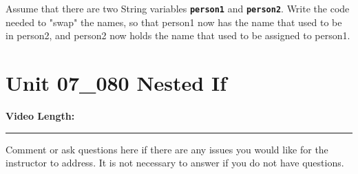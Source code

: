 \documentclass[letterpaper,12pt]{exam}
\newcommand{\unit}{Unit 07}
\begin{document}
\begin{questions}
\begin{samepage}
    \question Assume that there are two String variables \texttt{\textbf{person1}} and \texttt{\textbf{person2}}. Write the code needed to "swap" the names, so that person1 now has the name that used to be in person2, and person2 now holds the name that used to be assigned to person1.  
    \vspace{5mm}
\end{samepage}


\section*{\unit\_080 Nested If} %
\noindent \textbf{Video Length: }

\begin{samepage}
    \begin{center}
    \rule{0.8\textwidth}{.4pt}
    \end{center}
	\question Comment or ask questions here if there are any issues you would like for the instructor to address.  It is not necessary to answer if you do not have questions.
	\vspace{30mm}
\end{samepage}

\end{questions}
\end{document}
